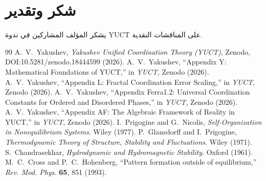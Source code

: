 \documentclass[12pt,a4paper]{article}
\begin{document}
	\section*{شكر وتقدير}
	يشكر المؤلف المشاركين في ندوة YUCT على المناقشات النقدية.
	
	\begin{thebibliography}{99}
		 A.~V.~Yakushev, \emph{Yakushev Unified Coordination Theory (YUCT)}, Zenodo, DOI:10.5281/zenodo.18444599 (2026).
		 A.~V.~Yakushev, ``Appendix Y: Mathematical Foundations of YUCT,'' in \emph{YUCT}, Zenodo (2026).
		 A.~V.~Yakushev, ``Appendix L: Fractal Coordination Error Scaling,'' in \emph{YUCT}, Zenodo (2026).
		 A.~V.~Yakushev, ``Appendix Ferra1.2: Universal Coordination Constants for Ordered and Disordered Phases,'' in \emph{YUCT}, Zenodo (2026).
		 A.~V.~Yakushev, ``Appendix AF: The Algebraic Framework of Reality in YUCT,'' in \emph{YUCT}, Zenodo (2026).
		 I.~Prigogine and G.~Nicolis, \emph{Self‑Organization in Nonequilibrium Systems}. Wiley (1977).
		 P.~Glansdorff and I.~Prigogine, \emph{Thermodynamic Theory of Structure, Stability and Fluctuations}. Wiley (1971).
		 S.~Chandrasekhar, \emph{Hydrodynamic and Hydromagnetic Stability}. Oxford (1961).
		 M.~C.~Cross and P.~C.~Hohenberg, ``Pattern formation outside of equilibrium,'' \emph{Rev. Mod. Phys.} \textbf{65}, 851 (1993).
	\end{thebibliography}
	
\end{document}
